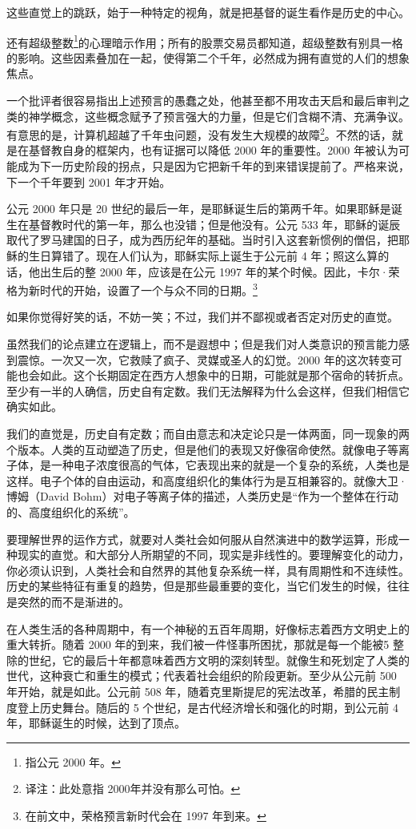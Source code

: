 这些直觉上的跳跃，始于一种特定的视角，就是把基督的诞生看作是历史的中心。


还有超级整数\footnote{指公元 2000 年。}的心理暗示作用；所有的股票交易员都知道，超级整数有别具一格的影响。这些因素叠加在一起，使得第二个千年，必然成为拥有直觉的人们的想象焦点。


一个批评者很容易指出上述预言的愚蠢之处，他甚至都不用攻击天启和最后审判之类的神学概念，这些概念赋予了预言强大的力量，但是它们含糊不清、充满争议。有意思的是，计算机超越了千年虫问题，没有发生大规模的故障\footnote{译注：此处意指 2000年并没有那么可怕。}。不然的话，就是在基督教自身的框架内，也有证据可以降低 2000 年的重要性。2000 年被认为可能成为下一历史阶段的拐点，只是因为它把新千年的到来错误提前了。严格来说，下一个千年要到 2001 年才开始。


公元 2000 年只是 20 世纪的最后一年，是耶稣诞生后的第两千年。如果耶稣是诞生在基督教时代的第一年，那么也没错；但是他没有。公元 533 年，耶稣的诞辰取代了罗马建国的日子，成为西历纪年的基础。当时引入这套新惯例的僧侣，把耶稣的生日算错了。现在人们认为，耶稣实际上诞生于公元前 4 年；照这么算的话，他出生后的整 2000 年，应该是在公元 1997 年的某个时候。因此，卡尔·荣格为新时代的开始，设置了一个与众不同的日期。\footnote{在前文中，荣格预言新时代会在 1997 年到来。}


如果你觉得好笑的话，不妨一笑；不过，我们并不鄙视或者否定对历史的直觉。


虽然我们的论点建立在逻辑上，而不是遐想中；但是我们对人类意识的预言能力感到震惊。一次又一次，它救赎了疯子、灵媒或圣人的幻觉。2000 年的这次转变可能也会如此。这个长期固定在西方人想象中的日期，可能就是那个宿命的转折点。至少有一半的人确信，历史自有定数。我们无法解释为什么会这样，但我们相信它确实如此。


我们的直觉是，历史自有定数；而自由意志和决定论只是一体两面，同一现象的两个版本。人类的互动塑造了历史，但是他们的表现又好像宿命使然。就像电子等离子体，是一种电子浓度很高的气体，它表现出来的就是一个复杂的系统，人类也是这样。电子个体的自由运动，和高度组织化的集体行为是互相兼容的。就像大卫·博姆（David Bohm）对电子等离子体的描述，人类历史是“作为一个整体在行动的、高度组织化的系统”。


要理解世界的运作方式，就要对人类社会如何服从自然演进中的数学运算，形成一种现实的直觉。和大部分人所期望的不同，现实是非线性的。要理解变化的动力，你必须认识到，人类社会和自然界的其他复杂系统一样，具有周期性和不连续性。历史的某些特征有重复的趋势，但是那些最重要的变化，当它们发生的时候，往往是突然的而不是渐进的。


在人类生活的各种周期中，有一个神秘的五百年周期，好像标志着西方文明史上的重大转折。随着 2000 年的到来，我们被一件怪事所困扰，那就是每一个能被5 整除的世纪，它的最后十年都意味着西方文明的深刻转型。就像生和死划定了人类的世代，这种衰亡和重生的模式；代表着社会组织的阶段更新。至少从公元前 500 年开始，就是如此。公元前 508 年，随着克里斯提尼的宪法改革，希腊的民主制度登上历史舞台。随后的 5 个世纪，是古代经济增长和强化的时期，到公元前 4 年，耶稣诞生的时候，达到了顶点。


